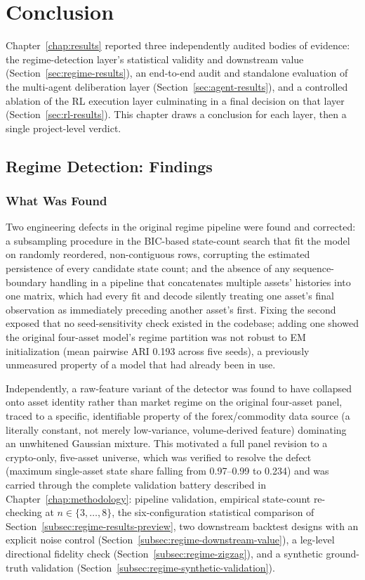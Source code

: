 \chapter{Conclusion}
\label{chap:conclusion}

Chapter~\ref{chap:results} reported three independently audited bodies of evidence: the regime-detection layer's statistical validity and downstream value (Section~\ref{sec:regime-results}), an end-to-end audit and standalone evaluation of the multi-agent deliberation layer (Section~\ref{sec:agent-results}), and a controlled ablation of the RL execution layer culminating in a final decision on that layer (Section~\ref{sec:rl-results}). This chapter draws a conclusion for each layer, then a single project-level verdict.

\section{Regime Detection: Findings}
\label{sec:conclusion-regime}

\subsection{What Was Found}
\label{subsec:conclusion-regime-findings}

Two engineering defects in the original regime pipeline were found and corrected: a subsampling procedure in the BIC-based state-count search that fit the model on randomly reordered, non-contiguous rows, corrupting the estimated persistence of every candidate state count; and the absence of any sequence-boundary handling in a pipeline that concatenates multiple assets' histories into one matrix, which had every fit and decode silently treating one asset's final observation as immediately preceding another asset's first. Fixing the second exposed that no seed-sensitivity check existed in the codebase; adding one showed the original four-asset model's regime partition was not robust to EM initialization (mean pairwise ARI 0.193 across five seeds), a previously unmeasured property of a model that had already been in use.

Independently, a raw-feature variant of the detector was found to have collapsed onto asset identity rather than market regime on the original four-asset panel, traced to a specific, identifiable property of the forex/commodity data source (a literally constant, not merely low-variance, volume-derived feature) dominating an unwhitened Gaussian mixture. This motivated a full panel revision to a crypto-only, five-asset universe, which was verified to resolve the defect (maximum single-asset state share falling from 0.97--0.99 to 0.234) and was carried through the complete validation battery described in Chapter~\ref{chap:methodology}: pipeline validation, empirical state-count re-checking at $n\in\{3,\ldots,8\}$, the six-configuration statistical comparison of Section~\ref{subsec:regime-results-preview}, two downstream backtest designs with an explicit noise control (Section~\ref{subsec:regime-downstream-value}), a leg-level directional fidelity check (Section~\ref{subsec:regime-zigzag}), and a synthetic ground-truth validation (Section~\ref{subsec:regime-synthetic-validation}).

